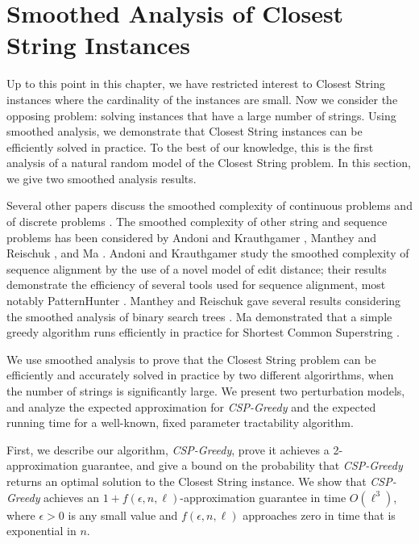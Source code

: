 \section{Smoothed Analysis of {\sc Closest String} Instances} \label{sec:large_CS_insances_v1}

Up to this point in this chapter, we have restricted interest to {\sc Closest String} instances where the cardinality of the instances are small.  Now we consider the opposing problem: solving instances that have a large number of strings. Using smoothed analysis, we demonstrate that {\sc Closest String} instances can be efficiently solved in practice. To the best of our knowledge, this is the first analysis of a natural random model of the {\sc Closest String} problem. In this section, we give two smoothed analysis results.  

Several other papers discuss the smoothed complexity of continuous problems \cite{BD02,DST02}  and of discrete problems \cite{DDM03,Ma08}.  The smoothed complexity of other string and sequence problems has been considered by Andoni and Krauthgamer \cite{AK}, Manthey and Reischuk \cite{MR05}, and Ma \cite{Ma08}.  Andoni and Krauthgamer \cite{AK} study the smoothed complexity of sequence alignment by the use of a novel model of edit distance; their results demonstrate the efficiency of several tools used for sequence alignment, most notably PatternHunter \cite{MTL}. Manthey and Reischuk gave several results considering the smoothed analysis of binary search trees \cite{MR05}.  Ma demonstrated that a simple greedy algorithm runs efficiently in practice for {\sc Shortest Common Superstring} \cite{Ma08}. 

We use smoothed analysis to prove that the {\sc Closest String} problem can be efficiently and accurately solved in practice by two different algorirthms, when the number of strings is significantly large.  We present two perturbation models, and analyze the expected approximation for {\em CSP-Greedy} and the expected running time for a well-known, fixed parameter tractability algorithm.  

First, we describe our algorithm, {\em CSP-Greedy}, prove it achieves a 2-approximation guarantee, and give a bound on the probability that {\em CSP-Greedy} returns an optimal solution to the {\sc Closest String} instance.  We show that {\em CSP-Greedy} achieves an $1 + f(\epsilon, n, \ell)$-approximation guarantee in time $O(\ell^3)$, where $\epsilon > 0$ is any small value and $f(\epsilon, n, \ell)$ approaches zero in time that is exponential in $n$.  

